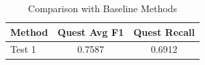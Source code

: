 
\begin{table}[h]
\centering
\caption{Comparison with Baseline Methods}
\label{tab:baseline}
\begin{tabular}{lcc}
\toprule
Method & Quest Avg F1 & Quest Recall \\
\midrule
Test 1 & 0.7587 & 0.6912 \\
\bottomrule
\end{tabular}
\end{table}

